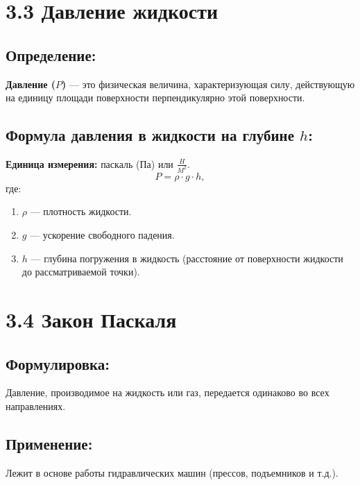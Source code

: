 \documentclass[a4paper,12pt]{article}
\begin{document}
\section*{3.3 Давление жидкости}
\vspace{-9pt}
\subsection*{Определение:}
\vspace{-3pt}
\textbf{Давление ($P$)} — это физическая величина, характеризующая силу, действующую на единицу площади поверхности перпендикулярно этой поверхности.

\vspace{-9pt}
\subsection*{Формула давления в жидкости на глубине $h$:}
\vspace{-3pt}
\textbf{Единица измерения:} паскаль (Па) или $\frac{H}{M^2}$.
\vspace{-0.05em}
$$ P = \rho \cdot g \cdot h, $$
где:
\begin{enumerate}[itemsep=0pt, topsep=0pt, parsep=2pt]
    \item $\rho$ — плотность жидкости.
    \item $g$ — ускорение свободного падения.
    \item $h$ — глубина погружения в жидкость (расстояние от поверхности жидкости до рассматриваемой точки).
\end{enumerate}



\section*{3.4 Закон Паскаля}
\vspace{-9pt}
\subsection*{Формулировка:}
\vspace{-3pt}
Давление, производимое на жидкость или газ, передается одинаково во всех направлениях.

\vspace{-9pt}
\subsection*{Применение:}
\vspace{-3pt}
Лежит в основе работы гидравлических машин (прессов, подъемников и т.д.).
\end{document}
